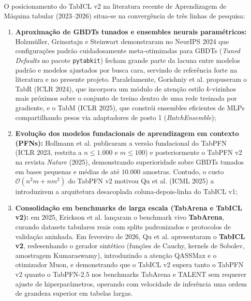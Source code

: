 \documentclass[11pt,a4paper]{article}
\begin{document}
O posicionamento do TabICL v2 na literatura recente de Aprendizagem de Máquina tabular (2023--2026) situa-se na convergência de três linhas de pesquisa:
\begin{enumerate}[leftmargin=2em]
    \item \textbf{Aproximação de GBDTs tunados e ensembles neurais paramétricos:} Holzmüller, Grinsztajn e Steinwart \cite{holzmuller2024better} demonstraram no NeurIPS 2024 que configurações padrão cuidadosamente meta-otimizadas para GBDTs (\emph{Tuned Defaults} no pacote \texttt{pytabkit}) fecham grande parte da lacuna entre modelos padrão e modelos ajustados por busca cara, servindo de referência forte na literatura e no presente projeto. Paralelamente, Gorishniy et al. propuseram o TabR \cite{gorishniy2024tabr} (ICLR 2024), que incorpora um módulo de atenção estilo $k$-vizinhos mais próximos sobre o conjunto de treino dentro de uma rede treinada por gradiente, e o TabM \cite{gorishniy2025tabm} (ICLR 2025), que constrói ensembles eficientes de MLPs compartilhando pesos via adaptadores de posto 1 (\emph{BatchEnsemble});
    \item \textbf{Evolução dos modelos fundacionais de aprendizagem em contexto (PFNs):} Hollmann et al. publicaram a versão fundacional do TabPFN \cite{hollmann2023tabpfn} (ICLR 2023, restrita a $n \le 1.000$ e $m \le 100$) e posteriormente o TabPFN v2 \cite{hollmann2025tabpfn} na revista \emph{Nature} (2025), demonstrando superioridade sobre GBDTs tunados em bases pequenas e médias de até $10.000$ amostras. Contudo, o custo $\mathcal{O}(n^2 m + n m^2)$ do TabPFN v2 motivou Qu et al. \cite{qu2025tabicl} (ICML 2025) a introduzirem a arquitetura desacoplada coluna-depois-linha do TabICL v1;
    \item \textbf{Consolidação em benchmarks de larga escala (TabArena e TabICL v2):} em 2025, Erickson et al. \cite{erickson2025tabarena} lançaram o benchmark vivo \textbf{TabArena}, curando datasets tabulares reais com splits padronizados e protocolos de validação aninhada. Em fevereiro de 2026, Qu et al. \cite{qu2026tabiclv2} apresentaram o \textbf{TabICL v2}, redesenhando o gerador sintético (funções de Cauchy, kernels de Sobolev, amostragem Kumaraswamy), introduzindo a atenção QASSMax e o otimizador Muon, e demonstrando que o TabICL v2 supera tanto o TabPFN v2 quanto o TabPFN-2.5 nos benchmarks TabArena e TALENT sem requerer ajuste de hiperparâmetros, operando com velocidade de inferência uma ordem de grandeza superior em tabelas largas.
\end{enumerate}
\end{document}
